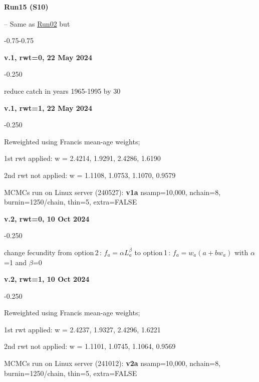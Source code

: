 \hypertarget{R15}{\textbf{Run15 (S10)}} -- Same as \hyperlink{R02}{Run02} but
\begin{itemize_csas}{-0.75}{-0.75}
	\item \textbf{v.1, rwt=0, 22 May 2024}
	\begin{itemize_csas}{-0.25}{0}
		\item reduce catch in years 1965-1995 by 30\pc{}
	\end{itemize_csas}
	\item \textbf{v.1, rwt=1, 22 May 2024}
	\begin{itemize_csas}{-0.25}{0}
		\item Reweighted using Francis mean-age weights;
		\item 1st rwt applied: w = 2.4214, 1.9291, 2.4286, 1.6190
		\item 2nd rwt not applied: w = 1.1108, 1.0753, 1.1070, 0.9579
		\item MCMCs run on Linux server (240527): \textbf{v1a} nsamp=10,000, nchain=8, burnin=1250/chain, thin=5, extra=FALSE
	\end{itemize_csas}
	\item \textbf{v.2, rwt=0, 10 Oct 2024}
	\begin{itemize_csas}{-0.25}{0}
		\item change fecundity from option\,2\,: $f_a = \alpha L_a^{\beta}$ to option\,1\,:  $f_a = w_a (a + b w_a)$ with $\alpha$=1 and $\beta$=0
	\end{itemize_csas}
	\item \textbf{v.2, rwt=1, 10 Oct 2024}
	\begin{itemize_csas}{-0.25}{0}
		\item Reweighted using Francis mean-age weights;
		\item 1st rwt applied: w = 2.4237, 1.9327, 2.4296, 1.6221
		\item 2nd rwt not applied: w = 1.1101, 1.0745, 1.1064, 0.9569
		\item MCMCs run on Linux server (241012): \textbf{v2a} nsamp=10,000, nchain=8, burnin=1250/chain, thin=5, extra=FALSE
	\end{itemize_csas}
\end{itemize_csas}

